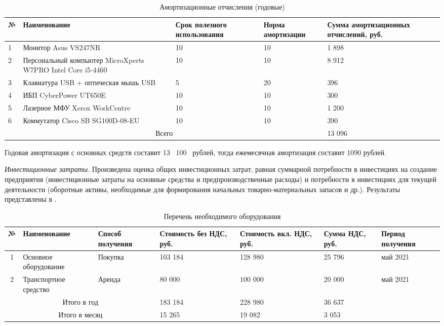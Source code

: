 \begin{table}[h!]
	\caption{Амортизационные отчисления (годовые)}
	\small
	\centering
	\begin{tabular}{|p{0.4cm}|p{6cm}|p{2cm}|p{3cm}|p{3cm}|}
		\hline
		№ & Наименование & Срок полезного использования & Норма амортизации & Сумма амортизационных отчислений, руб.  \\
		\hline
		1 & Монитор Asus VS247NR & 10 & 10 & 1 898 \\
		\hline
		2 &  Персональный компьютер MicroXperts W7PRO Intel Core i5-4460 & 10 & 10 & 8 912 \\
		\hline
		3 & Клавиатура USB + оптическая мышь USB & 5 & 20 & 396 \\
		\hline
		4 & ИБП CyberPower UT650E & 10 & 10 & 300 \\
		\hline
		5 & Лазерное МФУ Xerox WorkCentre & 10 & 10 & 1 200 \\
		\hline
		6 & Коммутатор Cisco SB SG100D-08-EU & 10 & 10 & 390 \\
		\hline
		\multicolumn{4}{|c|}{Всего} & 13 096 \\
		\hline
	\end{tabular}
	\label{tab:amort}
\end{table}

Годовая амортизация с основных средств составит 13~ 100~ рублей, тогда ежемесячная амортизация составит 1090 рублей.

\textit{Инвестиционные затраты}. Произведена оценка общих инвестиционных затрат, равная суммарной потребности в инвестициях на создание предприятия (инвестиционные затраты на основные средства и предпроизводственные расходы) и потребности в инвестициях для текущей деятельности (оборотные активы, необходимые для формирования начальных товарно-материальных запасов и др.). Результаты представлены в .

\begin{table}[h!]
	\caption{Перечень необходимого оборудования}
	\small
	\label{tab:my_sv}
	\centering
	\begin{tabular}{|c|p{2.6cm}|p{2.1cm}|p{2.5cm}|p{2.5cm}|p{1.8cm}|p{2cm}|}
		\hline
		№ & \small{Наименование} & \small{Способ получения} & \small{Стоимость без НДС, руб.} & \small{Стоимость вкл. НДС, руб.}& \small{Сумма НДС, руб.} & \small{Период получения}\\
		\hline
		1 & \small{Основное оборудование} & Покупка & 103 184 & 128 980 & 25 796 & май 2021 \\
		\hline
		2 & \small{Транспортное средство} & Аренда & 80 000 & 100 000 & 20 000 & май 2021\\
		\hline
		\multicolumn{3}{|c|}{Итого в год} & 183 184 & 228 980 & 36 637 & \\
		\hline
		\multicolumn{3}{|c|}{Итого в месяц} & 15 265 & 19 082 & 3 053 & \\
		\hline
	\end{tabular}
	
\end{table}

